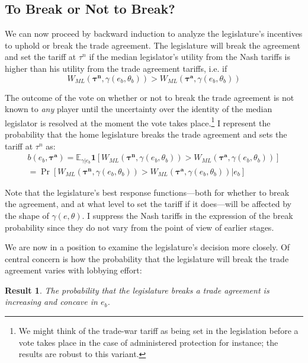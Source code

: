 \documentclass[10pt]{article}
\newtheorem{result}{Result}
\newcommand{\ve}{\theta}
\newcommand{\expect}{\mathbb{E}}
\newcommand{\bta}{\bm{\tau^a}}
\newcommand{\btn}{\bm{\tau^n}}
\newcommand{\ga}{\gamma}
\begin{document}
\bigskip
\subsection{To Break or Not to Break?}
\label{sec:break}
We can now proceed by backward induction to analyze the legislature's incentives to uphold or break the trade agreement. The legislature will break the agreement and set the tariff at $\tau^n$ if the median legislator's utility from the Nash tariffs is higher than his utility from the trade agreement tariffs, i.e. if
\begin{equation}
  W_{ML}(\btn,\ga(e_b,\ve_b)) > W_{ML}\left(\bta,\ga(e_b,\ve_b)\right)
  \label{eq:lwcg}
\end{equation}
  
The outcome of the vote on whether or not to break the trade agreement is not known to \textit{any} player until the uncertainty over the identity of the median legislator is resolved at the moment the vote takes place.\footnote{We might think of the trade-war tariff as being set in the legislation before a vote takes place in the case of administered protection for instance; the results are robust to this variant.} I represent the probability that the home legislature breaks the trade agreement and sets the tariff at $\tau^n$ as:
\begin{multline}
  b(e_b,\bta) = \expect_{\ga|e_b} \bm{1} [ W_{ML}(\btn,\ga(e_b,\ve_b)) > W_{ML}\left(\bta,\ga(e_b,\ve_b)\right) ] \\ = \Pr [ W_{ML}(\btn,\ga(e_b,\ve_b)) > W_{ML}\left(\bta,\ga(e_b,\ve_b)\right) | e_b]
  \label{eq:b}
\end{multline}

Note that the legislature's best response functions---both for whether to break the agreement, and at what level to set the tariff if it does---will be affected by the shape of $\ga(e,\ve)$. I suppress the Nash tariffs in the expression of the break probability since they do not vary from the point of view of earlier stages.

We are now in a position to examine the legislature's decision more closely. Of central concern is how the probability that the legislature will break the trade agreement varies with lobbying effort: 

\begin{result}
  The probability that the legislature breaks a trade agreement is increasing and concave in $e_b$.
  \label{res:bincC}
\end{result}
\end{document}
